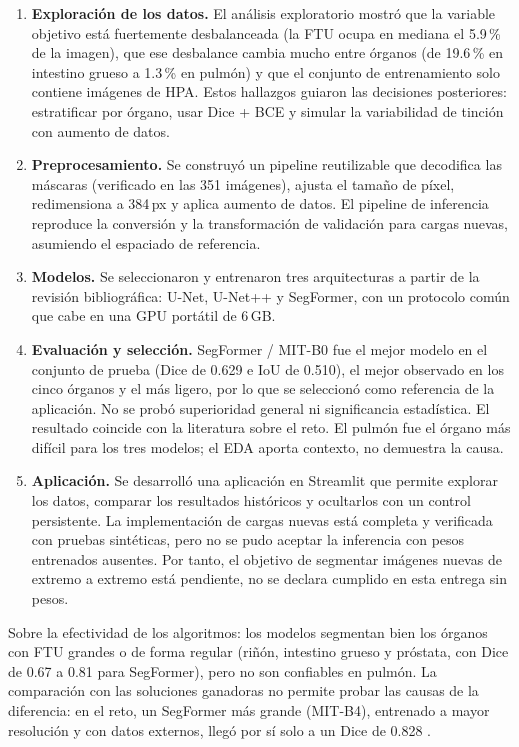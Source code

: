 \documentclass[11pt,letterpaper]{article}
\begin{document}
\begin{enumerate}
  \item \textbf{Exploración de los datos.} El análisis exploratorio mostró que la variable objetivo
        está fuertemente desbalanceada (la FTU ocupa en mediana el 5.9\,\% de la imagen), que ese
        desbalance cambia mucho entre órganos (de 19.6\,\% en intestino grueso a 1.3\,\% en pulmón) y
        que el conjunto de entrenamiento solo contiene imágenes de HPA. Estos hallazgos guiaron las
        decisiones posteriores: estratificar por órgano, usar Dice + BCE y simular la variabilidad
        de tinción con aumento de datos.
  \item \textbf{Preprocesamiento.} Se construyó un pipeline reutilizable que decodifica las máscaras
        (verificado en las 351 imágenes), ajusta el tamaño de píxel, redimensiona a 384\,px y aplica
        aumento de datos. El pipeline de inferencia reproduce la conversión y la transformación
        de validación para cargas nuevas, asumiendo el espaciado de referencia.
  \item \textbf{Modelos.} Se seleccionaron y entrenaron tres arquitecturas a partir de la revisión
        bibliográfica: U-Net, U-Net++ y SegFormer, con un protocolo común que cabe en una GPU portátil
        de 6\,GB.
  \item \textbf{Evaluación y selección.} SegFormer / MIT-B0 fue el mejor modelo en el conjunto de
        prueba (Dice de 0.629 e IoU de 0.510), el mejor observado en los cinco órganos y el más ligero,
        por lo que se seleccionó como referencia de la aplicación. No se probó superioridad general
        ni significancia estadística. El resultado
        coincide con la literatura sobre el reto. El pulmón fue el órgano más difícil para los tres
        modelos; el EDA aporta contexto, no demuestra la causa.
  \item \textbf{Aplicación.} Se desarrolló una aplicación en Streamlit que permite explorar los datos,
        comparar los resultados históricos y ocultarlos con un control persistente. La implementación
        de cargas nuevas está completa y verificada con pruebas sintéticas, pero no se pudo aceptar
        la inferencia con pesos entrenados ausentes. Por tanto, el objetivo de segmentar imágenes
        nuevas de extremo a extremo está pendiente, no se declara cumplido en esta entrega sin pesos.
\end{enumerate}

Sobre la efectividad de los algoritmos: los modelos segmentan bien los órganos con FTU grandes o de
forma regular (riñón, intestino grueso y próstata, con Dice de 0.67 a 0.81 para SegFormer), pero no
son confiables en pulmón. La comparación con las soluciones ganadoras no permite probar las causas
de la diferencia: en el reto, un SegFormer más grande
(MIT-B4), entrenado a mayor resolución y con datos externos, llegó por sí solo a un Dice de 0.828
\parencite{jain2023hacking}.
\end{document}
